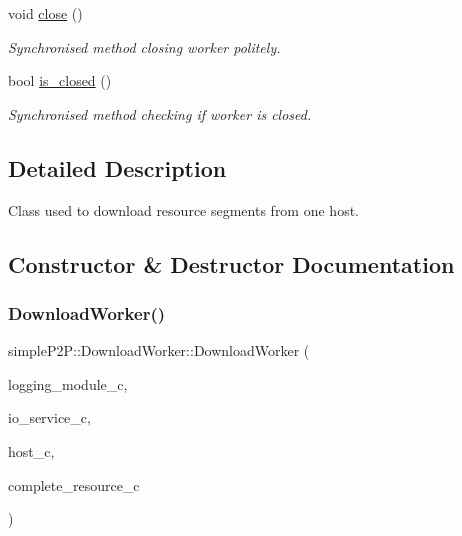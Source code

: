 \begin{DoxyCompactItemize}
void \hyperlink{classsimpleP2P_1_1DownloadWorker_ae975a4408ee3e8f85c0a067732dd44f0}{close} ()
\begin{DoxyCompactList}\small\item\em Synchronised method closing worker politely. \end{DoxyCompactList}\item 
\mbox{\label{classsimpleP2P_1_1DownloadWorker_a5e46b7b54882ef35bfaf48b51573a96e}} 
bool \hyperlink{classsimpleP2P_1_1DownloadWorker_a5e46b7b54882ef35bfaf48b51573a96e}{is\+\_\+closed} ()
\begin{DoxyCompactList}\small\item\em Synchronised method checking if worker is closed. \end{DoxyCompactList}\end{DoxyCompactItemize}


\subsection{Detailed Description}
Class used to download resource segments from one host. 

\subsection{Constructor \& Destructor Documentation}
\mbox{\label{classsimpleP2P_1_1DownloadWorker_ab56684896ce7f304918045ee96b340b0}} 
\subsubsection{\texorpdfstring{Download\+Worker()}{DownloadWorker()}}
{\footnotesize\ttfamily simple\+P2\+P\+::\+Download\+Worker\+::\+Download\+Worker (\begin{DoxyParamCaption}\item[{\hyperlink{classsimpleP2P_1_1Logging__Module}{Logging\+\_\+\+Module} \&}]{logging\+\_\+module\+\_\+c,  }\item[{boost\+::asio\+::io\+\_\+service \&}]{io\+\_\+service\+\_\+c,  }\item[{std\+::shared\+\_\+ptr$<$ \hyperlink{classsimpleP2P_1_1Host}{Host} $>$}]{host\+\_\+c,  }\item[{std\+::shared\+\_\+ptr$<$ \hyperlink{classsimpleP2P_1_1CompleteResource}{Complete\+Resource} $>$}]{complete\+\_\+resource\+\_\+c }\end{DoxyParamCaption})}




